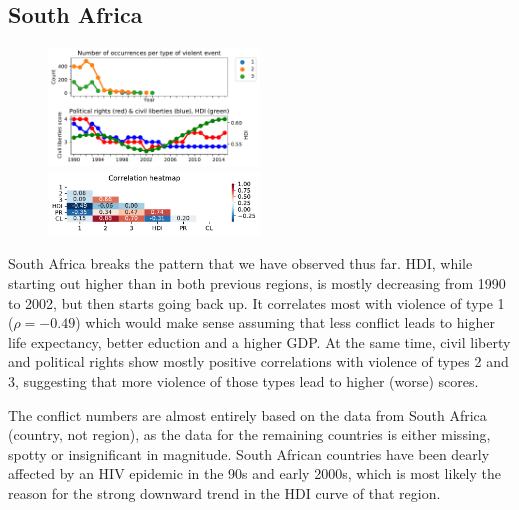 \documentclass[a4paper,11pt]{article}
\begin{document}
\subsection{South Africa}
\begin{figure}[ht!]
    \includegraphics[width=0.50\textwidth]{images/sa.pdf}
    \includegraphics[width=0.50\textwidth]{images/sa_corr.pdf}
\end{figure}

South Africa breaks the pattern that we have observed thus far. HDI, while starting out higher than in both previous regions, is mostly decreasing from 1990 to 2002, but then starts going back up. It correlates most with violence of type 1 ($\rho = -0.49$) which would make sense assuming that less conflict leads to higher life expectancy, better eduction and a higher GDP\@. At the same time, civil liberty and political rights show mostly positive correlations with violence of types 2 and 3, suggesting that more violence of those types lead to higher (worse) scores.

The conflict numbers are almost entirely based on the data from South Africa (country, not region), as the data for the remaining countries is either missing, spotty or insignificant in magnitude. South African countries have been dearly affected by an HIV epidemic in the 90s and early 2000s, which is most likely the reason for the strong downward trend in the HDI curve of that region.
\end{document}
